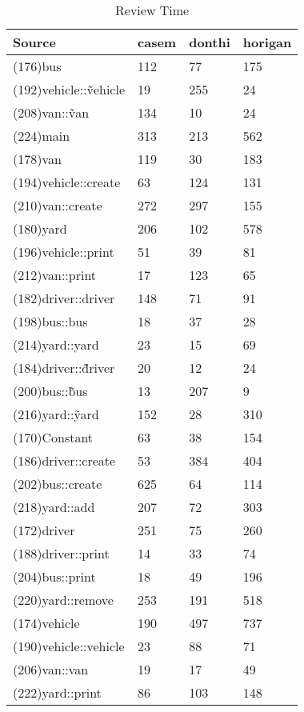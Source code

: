 \begin{table}[hb]
\begin{center}
\begin{tabular}{|l|l|l|l|}
\hline
Source & casem & donthi & horigan\\
\hline
(176)bus & 112 & 77 & 175\\
(192)vehicle::\~vehicle & 19 & 255 & 24\\
(208)van::\~van & 134 & 10 & 24\\
(224)main & 313 & 213 & 562\\
(178)van & 119 & 30 & 183\\
(194)vehicle::create & 63 & 124 & 131\\
(210)van::create & 272 & 297 & 155\\
(180)yard & 206 & 102 & 578\\
(196)vehicle::print & 51 & 39 & 81\\
(212)van::print & 17 & 123 & 65\\
(182)driver::driver & 148 & 71 & 91\\
(198)bus::bus & 18 & 37 & 28\\
(214)yard::yard & 23 & 15 & 69\\
(184)driver::\~driver & 20 & 12 & 24\\
(200)bus::\~bus & 13 & 207 & 9\\
(216)yard::\~yard & 152 & 28 & 310\\
(170)Constant & 63 & 38 & 154\\
(186)driver::create & 53 & 384 & 404\\
(202)bus::create & 625 & 64 & 114\\
(218)yard::add & 207 & 72 & 303\\
(172)driver & 251 & 75 & 260\\
(188)driver::print & 14 & 33 & 74\\
(204)bus::print & 18 & 49 & 196\\
(220)yard::remove & 253 & 191 & 518\\
(174)vehicle & 190 & 497 & 737\\
(190)vehicle::vehicle & 23 & 88 & 71\\
(206)van::van & 19 & 17 & 49\\
(222)yard::print & 86 & 103 & 148\\
\hline
\end{tabular}
\end{center}
\caption{Review Time}
\end{table}


